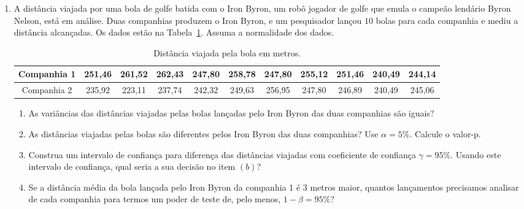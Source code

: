 \documentclass[8pt, a4paper]{article}
\begin{document}
\begin{enumerate}
	\item A distância viajada por uma bola de golfe batida com o Iron Byron, um robô jogador de golfe que emula o campeão lendário Byron Nelson, está em análise. Duas companhias produzem o Iron Byron, e um pesquisador lançou $10$ bolas para cada companhia e mediu a distância alcançadas. Os dados estão na Tabela~\ref{tab:iron-byron}. Assuma a normalidade dos dados.
	\begin{table}[ht]
		\centering
		\begin{tabular}{c|cccccccccc}
			\toprule[0.05cm]
			Companhia 1 & 251,46 & 261,52 & 262,43 & 247,80 & 258,78 & 247,80 & 255,12 & 251,46 & 240,49 & 244,14 \\ \midrule[0.025cm]
			Companhia 2 & 235,92 & 223,11 & 237,74 & 242,32 & 249,63 & 256,95 & 247,80 & 246,89 & 240,49 & 245,06 \\ 
			\bottomrule[0.05cm]
		\end{tabular}
		\caption{Distância viajada pela bola em metros.} 
		\label{tab:iron-byron}
	\end{table}
	\begin{enumerate}
		\item As variâncias das distâncias viajadas pelas bolas lançadas pelo Iron Byron das duas companhias são iguais?
		\item As distâncias viajadas pelas bolas são diferentes pelos Iron Byron das duas companhias? Use $\alpha=5\%$. Calcule o valor-p.
		\item Construa um intervalo de confiança para diferença das distâncias viajadas com coeficiente de confiança $\gamma=95\%$. Usando este intervalo de confiança, qual seria a sua decisão no item $(b)$?
		\item Se a distância média da bola lançada pelo Iron Byron da companhia 1 é 3 metros maior, quantos lançamentos precisamos analisar de cada companhia para termos um poder de teste de, pelo menos, $1-\beta = 95\%$?
	\end{enumerate}


\end{enumerate}
\end{document}
